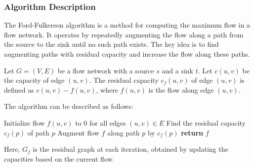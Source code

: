 \documentclass[12pt]{book} %
\begin{document}
\subsubsection{Algorithm Description}

The Ford-Fulkerson algorithm is a method for computing the maximum flow in a flow network. It operates by repeatedly augmenting the flow along a path from the source to the sink until no such path exists. The key idea is to find augmenting paths with residual capacity and increase the flow along these paths.

Let $G=(V, E)$ be a flow network with a source $s$ and a sink $t$. Let $c(u, v)$ be the capacity of edge $(u, v)$. The residual capacity $c_f(u, v)$ of edge $(u, v)$ is defined as $c(u, v) - f(u, v)$, where $f(u, v)$ is the flow along edge $(u, v)$.

The algorithm can be described as follows:
\FloatBarrier
\begin{algorithm}
\caption{Ford-Fulkerson Algorithm}
\begin{algorithmic}[1]
    \State Initialize flow $f(u, v)$ to 0 for all edges $(u, v) \in E$
        \State Find the residual capacity $c_f(p)$ of path $p$
        \State Augment flow $f$ along path $p$ by $c_f(p)$
    \EndWhile
    \State \textbf{return} $f$
\EndFunction
\end{algorithmic}
\end{algorithm}
\FloatBarrier
Here, $G_f$ is the residual graph at each iteration, obtained by updating the capacities based on the current flow.
\end{document}
